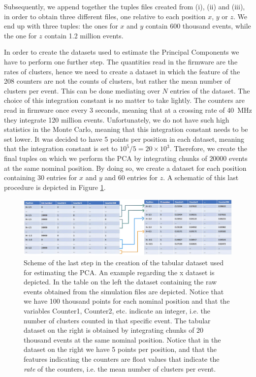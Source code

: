 Subsequently, we append together the tuples files created from (i), (ii) and (iii), in order to obtain three different files, one relative to each position $x$, $y$ or $z$. We end up with three tuples: the ones for $x$ and $y$ contain 600 thousand events, while the one for $z$ contain 1.2 million events. 

In order to create the datasets used to estimate the Principal Components we have to perform one further step.
The quantities read in the firmware are the rates of clusters, hence we need to create a dataset in which the feature of the 208 counters are not the counts of clusters, but rather the mean number of clusters per event. This can be done mediating over $N$ entries of the dataset. The choice of this integration constant is no matter to take lightly. The counters are read in firmware once every $3$ seconds, meaning that at a crossing rate of \SI{40}{\mega\hertz} they integrate 120 million events. Unfortunately, we do not have such high statistics in the Monte Carlo, meaning that this integration constant needs to be set lower. It was decided to have 5 points per position in each dataset, meaning that the integration constant is set to $10^5/5=20\times10^3$. Therefore, we create the final tuples on which we perform the PCA by integrating chunks of $20000$ events at the same nominal position. By doing so, we create a dataset for each position containing 30 entries for $x$ and $y$ and 60 entries for $z$. A schematic of this last procedure is depicted in Figure \ref{fig:tabular_dataset}. 

\begin{figure}
    \centering
    \includegraphics[width=\textwidth]{figures/tabular_dataset.png}
    \caption{Scheme of the last step in the creation of the tabular dataset used for estimating the PCA. An example regarding the x dataset is depicted. In the table on the left the dataset containing the raw events obtained from the simulation files are depicted. Notice that we have 100 thousand points for each nominal position and that the variables Counter1, Counter2, etc. indicate an integer, i.e. the number of clusters counted in that specific event. The tabular dataset on the right is obtained by integrating chunks of 20 thousand events at the same nominal position. Notice that in the dataset on the right we have 5 points per position, and that the features indicating the counters are float values that indicate the \textit{rate} of the counters, i.e. the mean number of clusters per event.}
    \label{fig:tabular_dataset}
\end{figure}

